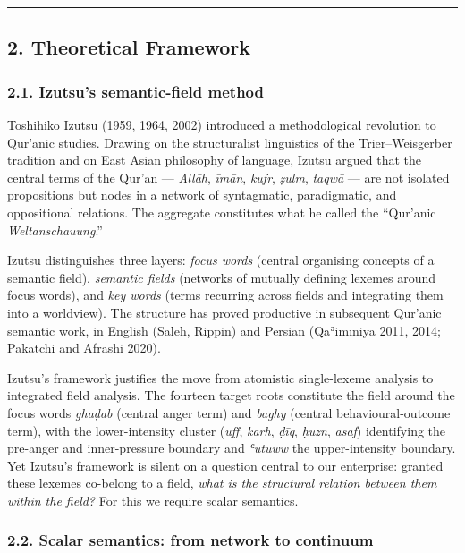 \begin{center}\rule{0.5\linewidth}{0.5pt}\end{center}

\subsection{2. Theoretical Framework}\label{theoretical-framework}

\subsubsection{2.1. Izutsu's semantic-field
method}\label{izutsus-semantic-field-method}

Toshihiko Izutsu (1959, 1964, 2002) introduced a methodological
revolution to Qur'anic studies. Drawing on the structuralist linguistics
of the Trier--Weisgerber tradition and on East Asian philosophy of
language, Izutsu argued that the central terms of the Qur'an ---
\emph{Allāh}, \emph{īmān}, \emph{kufr}, \emph{ẓulm}, \emph{taqwā} ---
are not isolated propositions but nodes in a network of syntagmatic,
paradigmatic, and oppositional relations. The aggregate constitutes what
he called the ``Qur'anic \emph{Weltanschauung}.''

Izutsu distinguishes three layers: \emph{focus words} (central
organising concepts of a semantic field), \emph{semantic fields}
(networks of mutually defining lexemes around focus words), and
\emph{key words} (terms recurring across fields and integrating them
into a worldview). The structure has proved productive in subsequent
Qur'anic semantic work, in English (Saleh, Rippin) and Persian
(Qāʾimīniyā 2011, 2014; Pakatchi and Afrashi 2020).

Izutsu's framework justifies the move from atomistic single-lexeme
analysis to integrated field analysis. The fourteen target roots
constitute the field around the focus words \emph{ghaḍab} (central anger
term) and \emph{baghy} (central behavioural-outcome term), with the
lower-intensity cluster (\emph{uff}, \emph{karh}, \emph{ḍīq},
\emph{ḥuzn}, \emph{asaf}) identifying the pre-anger and inner-pressure
boundary and \emph{ʿutuww} the upper-intensity boundary. Yet Izutsu's
framework is silent on a question central to our enterprise: granted
these lexemes co-belong to a field, \emph{what is the structural
relation between them within the field?} For this we require scalar
semantics.

\subsubsection{2.2. Scalar semantics: from network to
continuum}\label{scalar-semantics-from-network-to-continuum}

